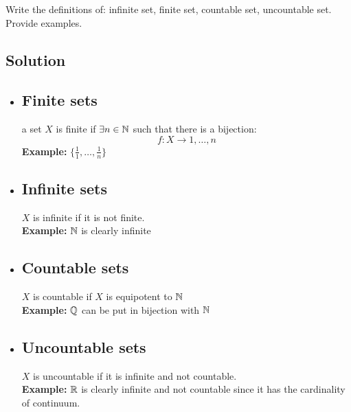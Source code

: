 
\question
Write the definitions of: infinite set, finite set, countable set, uncountable set. Provide examples.

\subsection*{Solution}
\provdefs
\begin{itemize}
    \item \subsection{Finite sets} a set $X$ is finite if $\exists n\in\mathbb{N}$ such that there is a bijection:
    \[
        f:X\to {1,\dots,n}    
    \]
    \textbf{Example:} $\{\frac{1}{1}, \dots, \frac{1}{n}\}$
    \item \subsection{Infinite sets} $X$ is infinite if it is not finite.\\
    \textbf{Example:} $\mathbb{N}$ is clearly infinite
    \item \subsection{Countable sets} $X$ is countable if $X$ is equipotent to $\mathbb{N}$\\
    \textbf{Example:} $\mathbb{Q}$ can be put in bijection with $\mathbb{N}$
    \item \subsection{Uncountable sets} $X$ is uncountable if it is infinite and not countable.\\
    \textbf{Example:} $\mathbb{R}$ is clearly infinite and not countable since it has the cardinality of continuum.
\end{itemize}